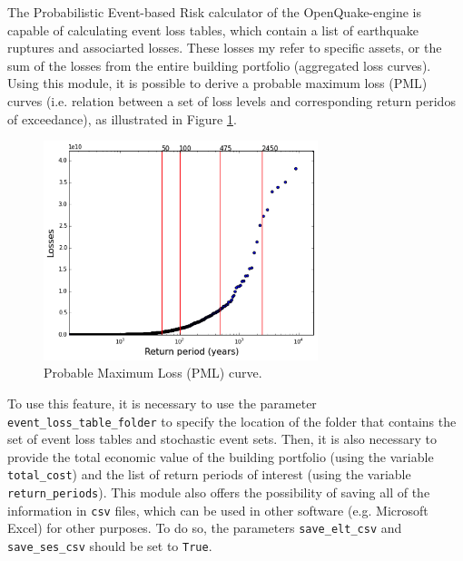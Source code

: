 The Probabilistic Event-based Risk calculator \citep{SilvaEtAl2014a} of the OpenQuake-engine is capable of calculating event loss tables, which contain a list of earthquake ruptures and associarted losses. These losses my refer to specific assets, or the sum of the losses from the entire building portfolio (aggregated loss curves). 
Using this module, it is possible to derive a probable maximum loss (PML) curves (i.e. relation between a set of loss levels and corresponding return peridos of exceedance), as illustrated in Figure \ref{fig:pml}.

\begin{figure}[htb]
  \centering
      \includegraphics[width=8cm]{Figures/pml_example.png}
  \caption{Probable Maximum Loss (PML) curve.}
  \label{fig:pml}
\end{figure}

To use this feature, it is necessary to use the parameter \verb=event_loss_table_folder= to specify the location of the folder that contains the set of event loss tables and stochastic event sets. Then, it is also necessary to provide the total economic value of the building portfolio (using the variable \verb=total_cost=) and the list of return periods of interest (using the variable \verb=return_periods=). This module also offers the possibility of saving all of the information in \verb=csv= files, which can be used in other software (e.g. Microsoft Excel) for other purposes. To do so, the parameters \verb=save_elt_csv= and \verb=save_ses_csv= should be set to \verb=True=.